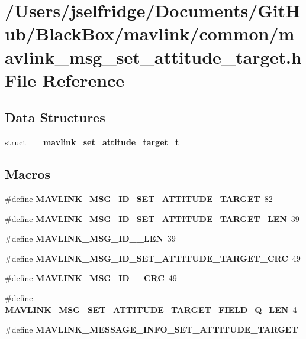 \section{/\+Users/jselfridge/\+Documents/\+Git\+Hub/\+Black\+Box/mavlink/common/mavlink\+\_\+msg\+\_\+set\+\_\+attitude\+\_\+target.h File Reference}
\label{mavlink__msg__set__attitude__target_8h}
\subsection*{Data Structures}
\begin{DoxyCompactItemize}
\item 
struct \textbf{ \+\_\+\+\_\+mavlink\+\_\+set\+\_\+attitude\+\_\+target\+\_\+t}
\end{DoxyCompactItemize}
\subsection*{Macros}
\begin{DoxyCompactItemize}
\item 
\#define \textbf{ M\+A\+V\+L\+I\+N\+K\+\_\+\+M\+S\+G\+\_\+\+I\+D\+\_\+\+S\+E\+T\+\_\+\+A\+T\+T\+I\+T\+U\+D\+E\+\_\+\+T\+A\+R\+G\+ET}~82
\item 
\#define \textbf{ M\+A\+V\+L\+I\+N\+K\+\_\+\+M\+S\+G\+\_\+\+I\+D\+\_\+\+S\+E\+T\+\_\+\+A\+T\+T\+I\+T\+U\+D\+E\+\_\+\+T\+A\+R\+G\+E\+T\+\_\+\+L\+EN}~39
\item 
\#define \textbf{ M\+A\+V\+L\+I\+N\+K\+\_\+\+M\+S\+G\+\_\+\+I\+D\+\_\+\_\+\+L\+EN}~39
\item 
\#define \textbf{ M\+A\+V\+L\+I\+N\+K\+\_\+\+M\+S\+G\+\_\+\+I\+D\+\_\+\+S\+E\+T\+\_\+\+A\+T\+T\+I\+T\+U\+D\+E\+\_\+\+T\+A\+R\+G\+E\+T\+\_\+\+C\+RC}~49
\item 
\#define \textbf{ M\+A\+V\+L\+I\+N\+K\+\_\+\+M\+S\+G\+\_\+\+I\+D\+\_\+\_\+\+C\+RC}~49
\item 
\#define \textbf{ M\+A\+V\+L\+I\+N\+K\+\_\+\+M\+S\+G\+\_\+\+S\+E\+T\+\_\+\+A\+T\+T\+I\+T\+U\+D\+E\+\_\+\+T\+A\+R\+G\+E\+T\+\_\+\+F\+I\+E\+L\+D\+\_\+\+Q\+\_\+\+L\+EN}~4
\item 
\#define \textbf{ M\+A\+V\+L\+I\+N\+K\+\_\+\+M\+E\+S\+S\+A\+G\+E\+\_\+\+I\+N\+F\+O\+\_\+\+S\+E\+T\+\_\+\+A\+T\+T\+I\+T\+U\+D\+E\+\_\+\+T\+A\+R\+G\+ET}
\end{DoxyCompactItemize}
